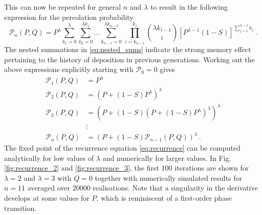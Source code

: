 \documentclass[amsmath,amssymb,amsfonts,aps,pre,preprint,superscriptaddress,bibnotes,showpacs,showkeys,longbibliography,nofootinbib]{revtex4-1}
\begin{document}
This can now be repeated for general $n$ and $\lambda$ to result in the following expression for the percolation probability
\begin{equation}
    \label{eq:nested_sums}
    \mathcal{P}_n(P,Q) = P^\lambda \sum\limits_{k_1=0}^\lambda \sum\limits_{k_2=0}^{\lambda k_1}\dots\sum\limits_{k_{n-1}=0}^{\lambda k_{n-2}} \, \prod\limits_{i=k_{n-1}}^{k_1}{\lambda k_{i-1} \choose i} \left[P^{\lambda-1} (1-S)\right]^{\sum\limits_{j=1}^{n-1}k_j}\, .
\end{equation}
The nested summations in \eqref{eq:nested_sums} indicate the strong memory effect pertaining to the history of deposition in  previous generations. Working out the above expressions explicitly starting with $\mathcal{P}_0 = 0$ gives 
\begin{equation}
    \label{eq:recurrence}
    \begin{split}
        \mathcal{P}_1(P,Q) &= P^\lambda\\
        \mathcal{P}_2(P,Q) &= \left(P+(1-S) P^\lambda\right)^\lambda\\
        \mathcal{P}_3(P,Q) &= \left(P+(1-S)\left(P+(1-S) P^\lambda\right)^\lambda\right)^\lambda\\
        &\vdots\\
        \mathcal{P}_n(P,Q) &= \left(P+(1-S)\mathcal{P}_{n-1}(P,Q)\right)^\lambda\, .
    \end{split}
\end{equation}
The fixed point of the recurrence equation \eqref{eq:recurrence} can be computed analytically for low values of $\lambda$ and numerically for larger values. In Fig. \ref{fig:recurrence_2} and \ref{fig:recurrence_3},  the first 100 iterations are shown for $\lambda = 2$ and $\lambda=3$ with $Q = 0$ together with numerically simulated results for $n=11$ averaged over 20000 realisations. Note that a singularity in the derivative develops at some values for $P$, which is reminiscent of a first-order phase transition.
\end{document}
